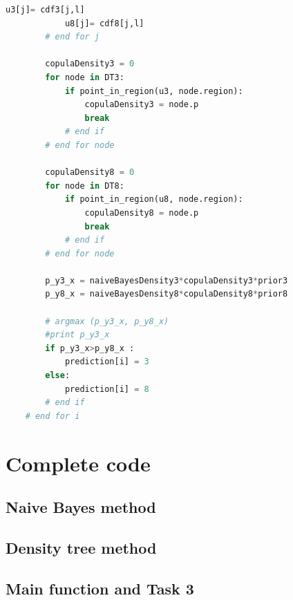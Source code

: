 \documentclass{article}
\begin{document}
\begin{lstlisting}[language=Python]
            u3[j]= cdf3[j,l]
            u8[j]= cdf8[j,l]
        # end for j
        
        copulaDensity3 = 0
        for node in DT3:
            if point_in_region(u3, node.region):
                copulaDensity3 = node.p
                break 
            # end if
        # end for node
                
        copulaDensity8 = 0
        for node in DT8:
            if point_in_region(u8, node.region):
                copulaDensity8 = node.p
                break 
            # end if
        # end for node
                
        p_y3_x = naiveBayesDensity3*copulaDensity3*prior3
        p_y8_x = naiveBayesDensity8*copulaDensity8*prior8
        
        # argmax (p_y3_x, p_y8_x) 
        #print p_y3_x
        if p_y3_x>p_y8_x :
            prediction[i] = 3
        else:
            prediction[i] = 8
        # end if        
    # end for i    
\end{lstlisting}    


\section{Complete code}
\subsection{Naive Bayes method}

\subsection{Density tree method}

\subsection{Main function and Task 3}

\end{document}
